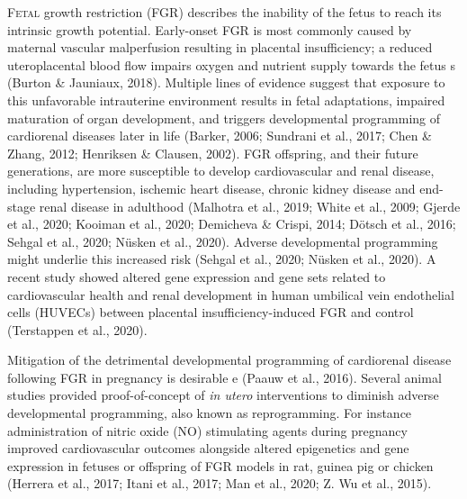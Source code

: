 \documentclass[authordate, empirical,issue]{jote-new-article}
\begin{document}
\lettrine{F}{etal} growth restriction (FGR) describes the inability of the fetus to reach its intrinsic growth potential. Early-onset FGR is most commonly caused by maternal vascular malperfusion resulting in placental insufficiency; a reduced uteroplacental blood flow impairs oxygen and nutrient supply towards the fetus s (Burton \& Jauniaux, 2018). Multiple lines of evidence suggest that exposure to this unfavorable intrauterine environment results in fetal adaptations, impaired maturation of organ development, and triggers developmental programming of cardiorenal diseases later in life (Barker, 2006; Sundrani et al., 2017; Chen \& Zhang, 2012; Henriksen \& Clausen, 2002). FGR offspring, and their future generations, are more susceptible to develop cardiovascular and renal disease, including hypertension, ischemic heart disease, chronic kidney disease and end-stage renal disease in adulthood (Malhotra et al., 2019; White et al., 2009; Gjerde et al., 2020; Kooiman et al., 2020; Demicheva \& Crispi, 2014; Dötsch et al., 2016; Sehgal et al., 2020; Nüsken et al., 2020). Adverse developmental programming might underlie this increased risk (Sehgal et al., 2020; Nüsken et al., 2020). A recent study showed altered gene expression and gene sets related to cardiovascular health and renal development in human umbilical vein endothelial cells (HUVECs) between placental insufficiency-induced FGR and control (Terstappen et al., 2020).



Mitigation of the detrimental developmental programming of cardiorenal disease following FGR in pregnancy is desirable e (Paauw et al., 2016). Several animal studies provided proof-of-concept of \emph{in utero }interventions to diminish adverse developmental programming, also known as reprogramming. For instance administration of nitric oxide (NO) stimulating agents during pregnancy improved cardiovascular outcomes alongside altered epigenetics and gene expression in fetuses or offspring of FGR models in rat, guinea pig or chicken (Herrera et al., 2017; Itani et al., 2017; Man et al., 2020; Z. Wu et al., 2015).
\end{document}
